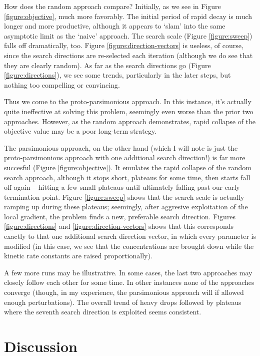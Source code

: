 \documentclass{article}
\begin{document}
How does the random approach compare?  Initially, as we see in Figure \ref{figure:objective}, much more favorably.  The initial period of rapid decay is much longer and more productive, although it appears to `slam' into the same asymptotic limit as the `naive' approach.  The search scale (Figure \ref{figure:sweep}) falls off dramatically, too.  Figure \ref{figure:direction-vectors} is useless, of course, since the search directions are re-selected each iteration (although we do see that they are clearly random).  As far as the search directions go (Figure \ref{figure:directions}), we see some trends, particularly in the later steps, but nothing too compelling or convincing.

Thus we come to the proto-parsimonious approach.  In this instance, it's actually quite ineffective at solving this problem, seemingly even worse than the prior two approaches.  However, as the random approach demonstrates, rapid collapse of the objective value may be a poor long-term strategy.

The parsimonious approach, on the other hand (which I will note is just the proto-parsimonious approach with one additional search direction!) is far more succesful (Figure \ref{figure:objective}).  It emulates the rapid collapse of the random search approach, although it stops short, plateaus for some time, then starts fall off again -- hitting a few small plateaus until ultimately falling past our early termination point.  Figure \ref{figure:sweep} shows that the search scale is actually ramping up during these plateaus; seemingly, after aggresive exploitation of the local gradient, the problem finds a new, preferable search direction.  Figures \ref{figure:directions} and \ref{figure:direction-vectors} shows that this corresponds exactly to that one additional search direction vector, in which every parameter is modified (in this case, we see that the concentrations are brought down while the kinetic rate constants are raised proportionally).

A few more runs may be illustrative.  In some cases, the last two approaches may closely follow each other for some time.  In other instances none of the approaches converge (though, in my experience, the parsimonious approach will if allowed enough perturbations).  The overall trend of heavy drops followed by plateaus where the seventh search direction is exploited seems consistent.

\section{Discussion}
\end{document}
